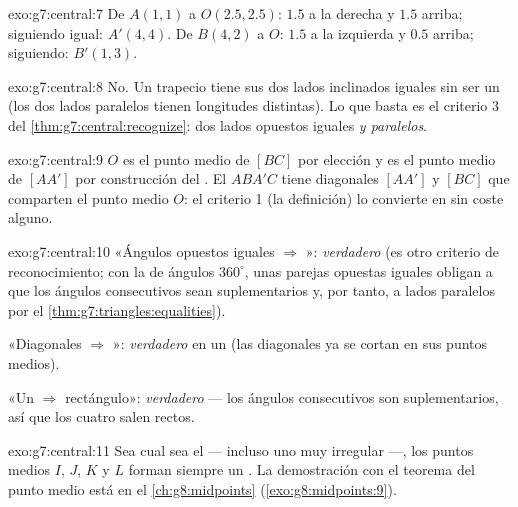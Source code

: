 \begin{solution}{exo:g7:central:7}
De $A(1,1)$ a $O(2.5, 2.5)$: $1.5$ a la derecha y $1.5$ arriba; siguiendo
igual: $A'(4, 4)$. De $B(4,2)$ a $O$: $1.5$ a la izquierda y $0.5$ arriba;
siguiendo: $B'(1, 3)$.
\end{solution}

\begin{solution}{exo:g7:central:8}
No. Un trapecio  tiene sus dos lados inclinados iguales sin
ser un  (los dos lados paralelos tienen longitudes
distintas). Lo que basta es el criterio 3 del
\cref{thm:g7:central:recognize}: dos lados opuestos iguales
\emph{y paralelos}.
\end{solution}

\begin{solution}{exo:g7:central:9}
$O$ es el punto medio de $[BC]$ por elección y es el punto medio de
$[AA']$ por construcción del . El  $ABA'C$
tiene diagonales $[AA']$ y $[BC]$ que comparten el punto medio $O$: el criterio
1 (la definición) lo convierte en  sin coste alguno.
\end{solution}

\begin{solution}{exo:g7:central:10}
«Ángulos opuestos iguales $\Rightarrow$ »: \emph{verdadero}
(es otro criterio de reconocimiento; con la  de ángulos
$360^\circ$, unas parejas opuestas iguales obligan a que los ángulos consecutivos sean
suplementarios y, por tanto, a lados paralelos por el
\cref{thm:g7:triangles:equalities}).

«Diagonales  $\Rightarrow$ »: \emph{verdadero} en un
 (las diagonales ya se cortan en sus puntos medios).

«Un  $\Rightarrow$ rectángulo»: \emph{verdadero} ---
los ángulos consecutivos son suplementarios, así que los cuatro salen rectos.
\end{solution}

\begin{solution}{exo:g7:central:11}
Sea cual sea el  --- incluso uno muy irregular ---, los
puntos medios $I$, $J$, $K$ y $L$ forman siempre un \emph{}. La
demostración con el teorema del punto medio está en el \cref{ch:g8:midpoints}
(\cref{exo:g8:midpoints:9}).
\end{solution}

